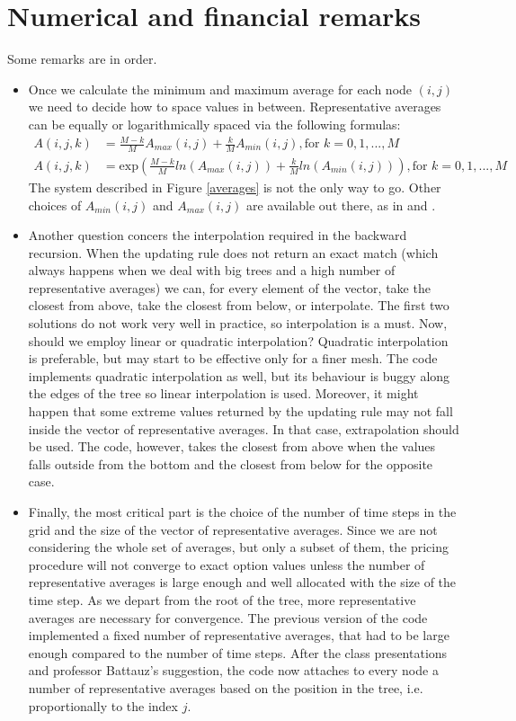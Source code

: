 \documentclass[12pt]{article}
\numberwithin{equation}{section}
\begin{document}
\section{Numerical and financial remarks}
Some remarks are in order.
\begin{itemize}
\item Once we calculate the minimum and maximum average for each node $(i,j)$ we need to decide how to space values in between. Representative averages can be equally or logarithmically spaced via the following formulas:
\begin{align*}
A(i,j,k) &= \frac{M-k}{M}A_{max}(i,j) + \frac{k}{M}A_{min}(i,j), \text{for } k = 0,1,...,M \\
A(i,j,k) &= \text{exp} \left( \frac{M-k}{M}ln(A_{max}(i,j)) + \frac{k}{M}ln(A_{min}(i,j)) \right ), \text{for } k = 0,1,...,M
\end{align*}
The system described in Figure \ref{averages} is not the only way to go. Other choices of $A_{min}(i,j)$ and $A_{max}(i,j)$ are available out there, as in \cite{Barraquand} and \cite{Klassen}. 
\item Another question concers the interpolation required in the backward recursion. When the updating rule does not return an exact match (which always happens when we deal with big trees and a high number of representative averages) we can, for every element of the vector, take the closest from above, take the closest from below, or interpolate. The first two solutions do not work very well in practice, so interpolation is a must. Now, should we employ linear or quadratic interpolation? Quadratic interpolation is preferable, but may start to be effective only for a finer mesh. The code implements quadratic interpolation as well, but its behaviour is buggy along the edges of the tree so linear interpolation is used. Moreover, it might happen that some extreme values returned by the updating rule may not fall inside the vector of representative averages. In that case, extrapolation should be used. The code, however, takes the closest from above when the values falls outside from the bottom and the closest from below for the opposite case.
\item Finally, the most critical part is the choice of the number of time steps in the grid and the size of the vector of representative averages. Since we are not considering the whole set of averages, but only a subset of them, the pricing procedure will not converge to exact option values unless the number of representative averages is large enough and well allocated with the size of the time step. As we depart from the root of the tree, more representative averages are necessary for convergence. The previous version of the code implemented a fixed number of representative averages, that had to be large enough compared to the number of time steps. After the class presentations and professor Battauz's suggestion, the code now attaches to every node a number of representative averages based on the position in the tree, i.e. proportionally to the index $j$.

\end{itemize}
\end{document}
